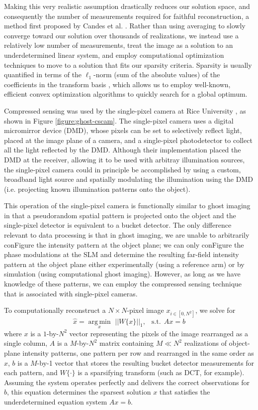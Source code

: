 Making this very realistic assumption drastically reduces our solution space, and consequently the number of measurements required for faithful reconstruction, a method first proposed by Candes et al. \cite{candes-stable}. Rather than using averaging to slowly converge toward our solution over thousands of realizations, we instead use a relatively low number of measurements, treat the image as a solution to an underdetermined linear system, and employ computational optimization techniques to move to a solution that fits our sparsity criteria. Sparsity is usually quantified in terms of the $\ell_1$-norm (sum of the absolute values) of the coefficients in the transform basis \cite{candes-stable}, which allows us to employ well-known, efficient convex optimization algorithms to quickly search for a global optimum.

Compressed sensing was used by the single-pixel camera at Rice University \cite{duarte-single}, as shown in Figure \ref{figure:ghost-cscam}. The single-pixel camera uses a digital micromirror device (DMD), whose pixels can be set to selectively reflect light, placed at the image plane of a camera, and a single-pixel photodetector to collect all the light reflected by the DMD. Although their implementation placed the DMD at the receiver, allowing it to be used with arbitray illumination sources, the single-pixel camera could in principle be accomplished by using a custom, broadband light source and spatially modulating the illumination using the DMD (i.e. projecting known illumination patterns onto the object).

This operation of the single-pixel camera is functionally similar to ghost imaging in that a pseudorandom spatial pattern is projected onto the object and the single-pixel detector is equivalent to a bucket detector. The only difference relevant to data processing is that in ghost imaging, we are unable to arbitrarily conFigure the intensity pattern at the object plane; we can only conFigure the phase modulations at the SLM and determine the resulting far-field intensity pattern at the object plane either experimentally (using a reference arm) or by simulation (using computational ghost imaging). However, as long as we have knowledge of these patterns, we can employ the compressed sensing technique that is associated with single-pixel cameras.

To computationally reconstruct a $N \times N$-pixel image $x_{i \in [0,N^2]}$, we solve for
\begin{equation}
\hat{x} = \underset{x}{\operatorname{arg\,min}}\,\,||W\{x\}||_1,\,\,\, \operatorname{s.t.}\,Ax = b
\end{equation}
where $x$ is a $1$-by-$N^2$ vector representing the pixels of the image rearranged as a single column, $A$ is a $M$-by-$N^2$ matrix containing $M \ll N^2$ realizations of object-plane intensity patterns, one pattern per row and rearranged in the same order as $x$, $b$ is a $M$-by-1 vector that stores the resulting bucket detector measurements for each pattern, and $W\{\cdot\}$ is a sparsifying transform (such as DCT, for example). Assuming the system operates perfectly and delivers the correct observations for $b$, this equation determines the sparsest solution $x$ that satisfies the underdetermined equation system $Ax = b$.

